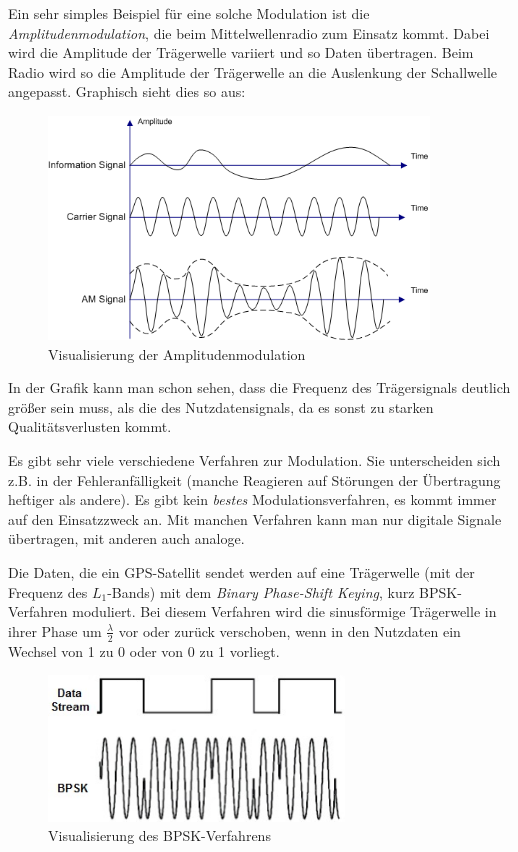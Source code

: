 \documentclass[12pt,a4paper]{scrartcl}
\begin{document}
Ein sehr simples Beispiel für eine solche Modulation ist die \emph{Amplitudenmodulation}, die beim Mittelwellenradio zum Einsatz kommt. Dabei wird die Amplitude der Trägerwelle variiert und so Daten übertragen. Beim Radio wird so die Amplitude der Trägerwelle an die Auslenkung der Schallwelle angepasst. Graphisch sieht dies so aus:

\begin{figure}[H]
\centering
\includegraphics[width=0.9\textwidth]{img/Illustration_of_Amplitude_Modulation.png}
\caption{Visualisierung der Amplitudenmodulation\cite{commons_am}}
\label{fig:am}
\end{figure}

In der Grafik kann man schon sehen, dass die Frequenz des Trägersignals deutlich größer sein muss, als die des Nutzdatensignals, da es sonst zu starken Qualitätsverlusten kommt.

Es gibt sehr viele verschiedene Verfahren zur Modulation. Sie unterscheiden sich z.B. in der Fehleranfälligkeit (manche Reagieren auf Störungen der Übertragung heftiger als andere). Es gibt kein \emph{bestes} Modulationsverfahren, es kommt immer auf den Einsatzzweck an. Mit manchen Verfahren kann man nur digitale Signale übertragen, mit anderen auch analoge.

Die Daten, die ein GPS-Satellit sendet werden auf eine Trägerwelle (mit der Frequenz des $L_1$-Bands) mit dem \emph{Binary Phase-Shift Keying}, kurz BPSK-Verfahren moduliert.
Bei diesem Verfahren wird die sinusförmige Trägerwelle in ihrer Phase um $\frac{\lambda}{2}$ vor oder zurück verschoben, wenn in den Nutzdaten ein Wechsel von 1 zu 0 oder von 0 zu 1 vorliegt.

\begin{figure}[H]
\centering
\includegraphics[width=0.7\textwidth]{img/bpsk.jpg}
\caption{Visualisierung des BPSK-Verfahrens\cite{evalidate_bpsk}}
\label{fig:bpsk}
\end{figure}
\end{document}
